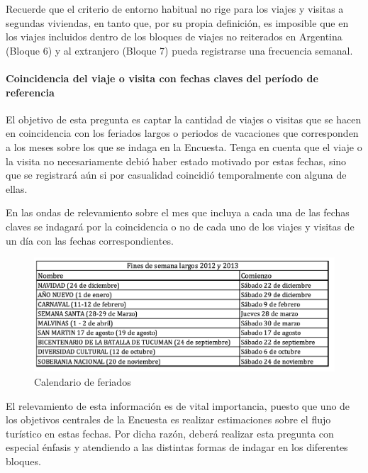 \documentclass[
  openany]{book}
\begin{document}
Recuerde que el criterio de entorno habitual no rige para los viajes y visitas a segundas viviendas, en tanto que, por su propia definición, es imposible que en los viajes incluidos dentro de los bloques de viajes no reiterados en Argentina (Bloque 6) y al extranjero (Bloque 7) pueda registrarse una frecuencia semanal.

\hypertarget{coincidencia-del-viaje-o-visita-con-fechas-claves-del-peruxedodo-de-referencia}{%
\paragraph{Coincidencia del viaje o visita con fechas claves del período de referencia}\label{coincidencia-del-viaje-o-visita-con-fechas-claves-del-peruxedodo-de-referencia}}

El objetivo de esta pregunta es captar la cantidad de viajes o visitas que se hacen en coincidencia con los feriados largos o periodos de vacaciones que corresponden a los meses sobre los que se indaga en la Encuesta. Tenga en cuenta que el viaje o la visita no necesariamente debió haber estado motivado por estas fechas, sino que se registrará aún si por casualidad coincidió temporalmente con alguna de ellas.

En las ondas de relevamiento sobre el mes que incluya a cada una de las fechas claves se indagará por la coincidencia o no de cada uno de los viajes y visitas de un día con las fechas correspondientes.

\begin{figure}

{\centering \includegraphics[width=1\linewidth]{imagenes/figura6-89} 

}

\caption{Calendario de feriados}\label{fig:calen}
\end{figure}

El relevamiento de esta información es de vital importancia, puesto que uno de los objetivos centrales de la Encuesta es realizar estimaciones sobre el flujo turístico en estas fechas. Por dicha razón, deberá realizar esta pregunta con especial énfasis y atendiendo a las distintas formas de indagar en los diferentes bloques.
\end{document}
